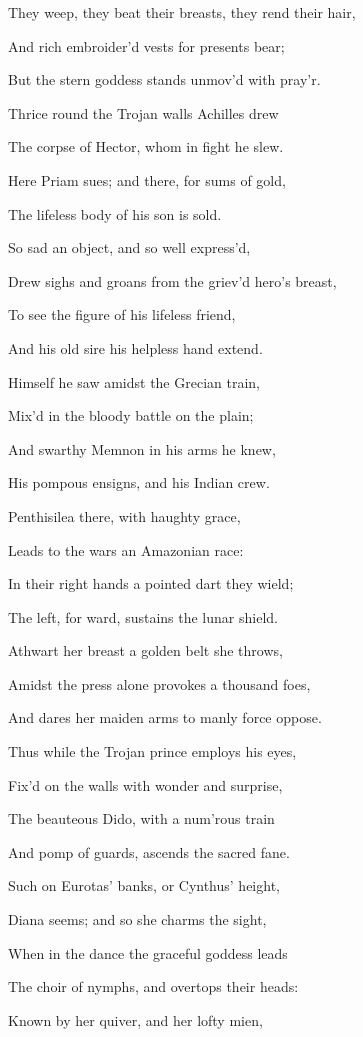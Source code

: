 They weep, they beat their breasts, they rend their hair,

And rich embroider’d vests for presents bear;

But the stern goddess stands unmov’d with pray’r.

Thrice round the Trojan walls Achilles drew

The corpse of Hector, whom in fight he slew.

Here Priam sues; and there, for sums of gold,

The lifeless body of his son is sold.

So sad an object, and so well express’d,

Drew sighs and groans from the griev’d hero’s breast,

To see the figure of his lifeless friend,

And his old sire his helpless hand extend.

Himself he saw amidst the Grecian train,

Mix’d in the bloody battle on the plain;

And swarthy Memnon in his arms he knew,

His pompous ensigns, and his Indian crew.

Penthisilea there, with haughty grace,

Leads to the wars an Amazonian race:

In their right hands a pointed dart they wield;

The left, for ward, sustains the lunar shield.

Athwart her breast a golden belt she throws,

Amidst the press alone provokes a thousand foes,

And dares her maiden arms to manly force oppose.

Thus while the Trojan prince employs his eyes,

Fix’d on the walls with wonder and surprise,

The beauteous Dido, with a num’rous train

And pomp of guards, ascends the sacred fane.

Such on Eurotas’ banks, or Cynthus’ height,

Diana seems; and so she charms the sight,

When in the dance the graceful goddess leads

The choir of nymphs, and overtops their heads:

Known by her quiver, and her lofty mien,

